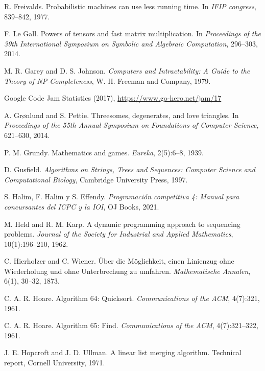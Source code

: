 \begin{thebibliography}{9}
  R. Freivalds.
  Probabilistic machines can use less running time.
  In \emph{IFIP congress}, 839--842, 1977.

  F. Le Gall.
  Powers of tensors and fast matrix multiplication.
  In \emph{Proceedings of the 39th International Symposium on Symbolic and Algebraic Computation},
  296--303, 2014.

  M. R. Garey and D. S. Johnson.
  \emph{Computers and Intractability:
  A Guide to the Theory of NP-Completeness},
  W. H. Freeman and Company, 1979.

  Google Code Jam Statistics (2017),
  \url{https://www.go-hero.net/jam/17}

  A. Grønlund and S. Pettie.
  Threesomes, degenerates, and love triangles.
  In \emph{Proceedings of the 55th Annual Symposium on Foundations of Computer Science},
  621--630, 2014.

  P. M. Grundy.
  Mathematics and games.
  \emph{Eureka}, 2(5):6--8, 1939.

  D. Gusfield.
  \emph{Algorithms on Strings, Trees and Sequences:
  Computer Science and Computational Biology},
  Cambridge University Press, 1997.


  S. Halim, F. Halim y S. Effendy.
  \emph{Programación competitiva 4: Manual para concursantes del ICPC y la IOI}, OJ Books, 2021.

  M. Held and R. M. Karp.
  A dynamic programming approach to sequencing problems.
  \emph{Journal of the Society for Industrial and Applied Mathematics}, 10(1):196--210, 1962.

  C. Hierholzer and C. Wiener.
  Über die Möglichkeit, einen Linienzug ohne Wiederholung und ohne Unterbrechung zu umfahren.
  \emph{Mathematische Annalen}, 6(1), 30--32, 1873.

  C. A. R. Hoare.
  Algorithm 64: Quicksort.
  \emph{Communications of the ACM}, 4(7):321, 1961.

  C. A. R. Hoare.
  Algorithm 65: Find.
  \emph{Communications of the ACM}, 4(7):321--322, 1961.

  J. E. Hopcroft and J. D. Ullman.
  A linear list merging algorithm.
  Technical report, Cornell University, 1971.


\end{thebibliography}
